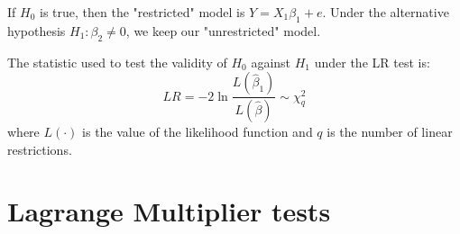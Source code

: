 If $H_0$ is true, then the "restricted" model is $Y = X_1\beta_1 + e$. Under the alternative hypothesis $H_1:\beta_2 \neq 0$, we keep our "unrestricted" model.

\begin{proposition}
The statistic used to test the validity of $H_0$ against $H_1$ under the LR test is: $$LR = -2\ln\frac{L(\hat\beta_1)}{L(\hat\beta)} \sim \chi_q^2 $$ where $L(\cdot)$ is the value of the likelihood function and $q$ is the number of linear restrictions.
\end{proposition}

\section{Lagrange Multiplier tests}